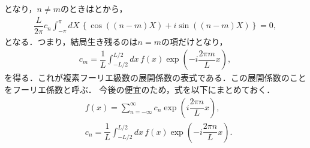 となり，$n\neq m$のときはとから，
\begin{align}
 \dfrac{L}{2\pi}   c_n \int_{-\pi}^{\pi}dX\, \left\{\cos\left(\left(n-m\right)X\right) + i\sin\left(\left(n-m\right)X\right)\right\} = 0, 
\end{align}
となる．つまり，結局生き残るのは$n=m$の項だけとなり，
\begin{align}
  c_m = \dfrac{1}{L}\int_{-L/2}^{L/2}dx\,f\left(x\right)\exp\left(-i\dfrac{2\pi m}{L}x \right), 
\end{align}
を得る．これが複素フーリエ級数の展開係数の表式である．この展開係数のことをフーリエ係数と呼ぶ．
今後の便宜のため，式を以下にまとめておく．
\begin{align}
 & f\left(x\right) = \sum_{n=-\infty}^{\infty} c_{n} \exp\left(i\dfrac{2\pi n}{L}x\right), \label{complex_fourier}\\
 & c_n = \dfrac{1}{L}\int_{-L/2}^{L/2}dx\,f\left(x\right)\exp\left(-i\dfrac{2\pi n}{L}x \right). \label{complex_fourier_coef}
\end{align}
%
